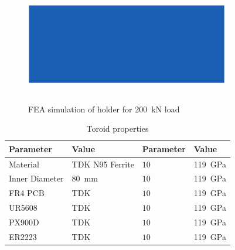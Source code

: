 \documentclass[conference]{IEEEtran}
\begin{document}
\begin{figure}
  \centering
  \includegraphics[width=3.5in, height=2in]{figures/holderfea.pdf}
  \caption{FEA simulation of holder for \SI{200}{\kilo\newton} load}
  \label{fig:holderfea}
\end{figure}
\begin{table}
  \centering
  \caption{Toroid properties}
  \begin{tabular}{@{}llll@{}}
    \toprule
    Parameter & Value & Parameter & Value \\ \midrule
    Material & TDK N95 Ferrite & $10$ & \SI{119}{\giga\pascal} \\
    Inner Diameter & \SI{80}{\milli\meter}& $10$ & \SI{119}{\giga\pascal} \\
    FR4 PCB & TDK & $10$ & \SI{119}{\giga\pascal} \\
    UR5608 & TDK & $10$ & \SI{119}{\giga\pascal} \\
    PX900D & TDK & $10$ & \SI{119}{\giga\pascal} \\
    ER2223 & TDK & $10$ & \SI{119}{\giga\pascal} \\
    \bottomrule
  \end{tabular}
\end{table}
\end{document}
